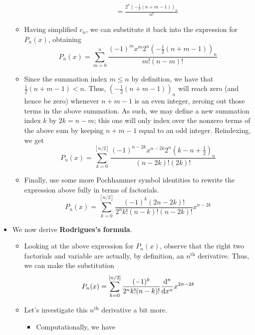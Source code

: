\documentclass[../finalProject.tex]{subfiles}
\begin{document}
\begin{itemize}
\begin{itemize}
\begin{itemize}
\begin{align*}
                &= \frac{2^n\left( -\tfrac{1}{2}(n+m-1) \right)_n}{n!}
            \end{align*}
        \end{itemize}
        \item Having simplified $c_n$, we can substitute it back into the expression for $P_n(x)$, obtaining
        \begin{equation*}
            P_n(x) = \sum_{m=0}^n\frac{(-1)^mx^m2^n\left( -\tfrac{1}{2}(n+m-1) \right)_n}{m!(n-m)!}
        \end{equation*}
        \item Since the summation index $m\leq n$ by definition, we have that $\tfrac{1}{2}(n+m-1)<n$. Thus, $(-\tfrac{1}{2}(n+m-1))_n$ will reach zero (and hence be zero) whenever $n+m-1$ is an even integer, zeroing out those terms in the above summation. As such, we may define a new summation index $k$ by $2k=n-m$; this one will only index over the nonzero terms of the above sum by keeping $n+m-1$ equal to an odd integer. Reindexing, we get
        \begin{equation*}
            P_n(x) = \sum_{k=0}^{[n/2]}\frac{(-1)^{n-2k}x^{n-2k}2^n\left( k-n+\tfrac{1}{2} \right)_n}{(n-2k)!(2k)!}
        \end{equation*}
        \item Finally, use some more Pochhammer symbol identities to rewrite the expression above fully in terms of factorials.
        \begin{equation*}
            P_n(x) = \sum_{k=0}^{[n/2]}\frac{(-1)^k(2n-2k)!}{2^nk!(n-k)!(n-2k)!}x^{n-2k}
        \end{equation*}
    \end{itemize}
    \item We now derive \textbf{Rodrigues's formula}.
    \begin{itemize}
        \item Looking at the above expression for $P_n(x)$, observe that the right two factorials and variable are actually, by definition, an $n^\text{th}$ derivative. Thus, we can make the substitution
        \begin{equation*}
            P_n(x) = \sum_{k=0}^{[n/2]}\frac{(-1)^k}{2^nk!(n-k)!}\dv[n]{x}x^{2n-2k}
        \end{equation*}
        \item Let's investigate this $n^\text{th}$ derivative a bit more.
        \begin{itemize}
            \item Computationally, we have

\end{itemize}
\end{itemize}
\end{itemize}
\end{document}

